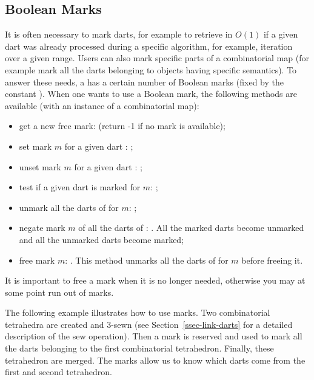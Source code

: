 \begin{ccAdvanced}
\subsection{Boolean Marks\label{ssec-adv-marks}}
It is often necessary to mark darts, for example to retrieve in $O(1)$
if a given dart was already processed during a specific algorithm, for example, 
iteration over a given range. Users can also mark specific parts of a
combinatorial map (for example mark all the darts belonging to objects
having specific semantics).  To answer these needs, a
 has a certain number of Boolean marks (fixed by
the constant ).  When one
wants to use a Boolean mark, the following methods are available (with
 an instance of a combinatorial map):
\begin{itemize}
\item get a new free mark:  (return
  -1 if no mark is available);

\item set mark $m$ for a given dart : ;
\item unset mark $m$ for a given dart : ;
\item test if a given dart  is marked for $m$: ;

\item unmark all the darts of  for $m$: ;

\item negate mark $m$ of all the darts of : .
  All the marked darts become unmarked and all the unmarked darts become marked;

\item free mark $m$:
  . This method unmarks all the darts of 
  for $m$ before freeing it.%
\end{itemize}

It is important to free a mark when it is no longer needed, otherwise 
you may at some point run out of marks. 

The following example illustrates how to use marks.  Two combinatorial
tetrahedra are created and 3-sewn (see Section~\ref{ssec-link-darts}
for a detailed description of the sew operation). Then a mark is
reserved and used to mark all the darts belonging to the first
combinatorial tetrahedron. Finally, these tetrahedron are merged.  The
marks allow us to know which darts come from the first and second
tetrahedron.


\end{ccAdvanced}
